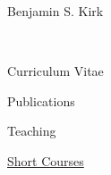 \documentclass[10pt]{report}
\begin{document}
\begin{cv}{\centerline{\Large Benjamin S. Kirk}\\
    \centerline{\large Curriculum Vitae}}
\begin{cvlist}{Publications}


    \end{cvlist}

  \begin{cvlist}{Teaching}

    \item[\underline{Short Courses}]    


\end{cvlist}
\end{cv}
\end{document}
